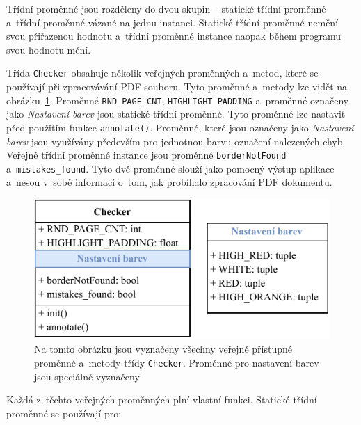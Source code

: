 Třídní proměnné jsou rozděleny do dvou skupin -- statické třídní proměnné
a~třídní proměnné vázané na jednu instanci. Statické třídní proměnné nemění 
svou přiřazenou hodnotu a~třídní proměnné instance naopak během programu
svou hodnotu mění.

Třída \texttt{Checker} obsahuje několik veřejných proměnných a~metod, 
které se používají 
při zpracovávání PDF souboru. Tyto proměnné a~metody lze vidět na 
obrázku~\ref{pic_class_Checker}. Proměnné \texttt{RND\_PAGE\_CNT},
\texttt{HIGHLIGHT\_PADDING} a~proměnné označeny jako \emph{Nastavení barev}
jsou statické třídní proměnné. Tyto proměnné lze nastavit před použitím
funkce \texttt{annotate()}. Proměnné, které jsou označeny jako
\emph{Nastavení barev} jsou využívány především pro jednotnou barvu označení
nalezených chyb. Veřejné třídní proměnné instance jsou proměnné 
\texttt{borderNotFound} a~\texttt{mistakes\_found}. Tyto dvě proměnné
slouží jako pomocný výstup aplikace a~nesou v~sobě informaci o~tom, jak
probíhalo zpracování PDF dokumentu.
\begin{figure}[H]
    \centering
    \includegraphics[width=0.7\linewidth]{obrazky-figures/class_Checker.pdf}
    \caption{
        Na tomto obrázku jsou vyznačeny všechny veřejně přístupné proměnné
        a~metody třídy \texttt{Checker}. Proměnné pro nastavení barev jsou
        speciálně vyznačeny
    }
    \label{pic_class_Checker}
\end{figure}
Každá z~těchto veřejných proměnných plní vlastní funkci. Statické třídní
proměnné se používají pro:

